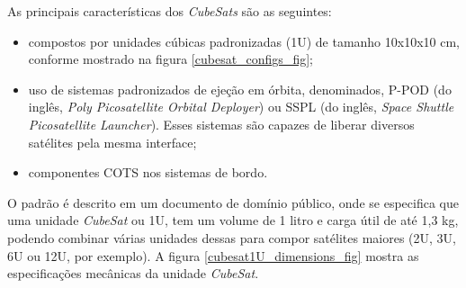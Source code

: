 As principais características dos \textit{CubeSats} são as seguintes:
\begin{itemize}
    \item compostos por unidades cúbicas padronizadas (1U) de tamanho 10x10x10 cm, conforme mostrado na figura \ref{cubesat_configs_fig};
    \item uso de sistemas padronizados de ejeção em órbita, denominados, P-POD (do inglês, \textit{Poly Picosatellite Orbital Deployer}) ou SSPL (do inglês, \textit{Space Shuttle Picosatellite Launcher}). Esses sistemas são capazes de liberar diversos satélites pela mesma interface;
    \item componentes COTS nos sistemas de bordo.
\end{itemize}

\noindent
\begin{minipage}{\linewidth}
\label{cubesat_configs_fig}
\end{minipage}

O padrão é descrito em um documento de domínio público\cite{cubesat_specs_rev13}, onde se especifica que uma unidade \textit{CubeSat} ou 1U, tem um volume de 1 litro e carga útil de até 1,3 kg, podendo combinar várias unidades dessas para compor satélites maiores (2U, 3U, 6U ou 12U, por exemplo). A figura \ref{cubesat1U_dimensions_fig} mostra as especificações mecânicas da unidade \textit{CubeSat}.

